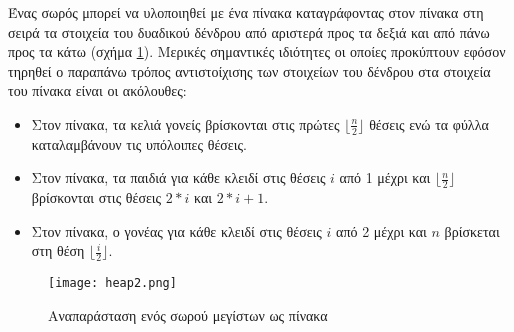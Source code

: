 Ένας σωρός μπορεί να υλοποιηθεί με ένα πίνακα καταγράφοντας στον πίνακα στη σειρά τα στοιχεία του δυαδικού δένδρου από αριστερά προς τα δεξιά και από πάνω προς τα κάτω (σχήμα \ref{fig:heap2}). Μερικές σημαντικές ιδιότητες οι οποίες προκύπτουν εφόσον τηρηθεί ο παραπάνω τρόπος αντιστοίχισης των στοιχείων του δένδρου στα στοιχεία του  πίνακα είναι οι ακόλουθες:
\begin{itemize}[noitemsep]
\item	Στον πίνακα, τα κελιά γονείς βρίσκονται στις πρώτες $\lfloor{\frac{n}{2}}\rfloor$ θέσεις ενώ τα φύλλα καταλαμβάνουν τις υπόλοιπες θέσεις. 
\item	Στον πίνακα, τα παιδιά για κάθε κλειδί στις θέσεις $i$ από 1 μέχρι και $\lfloor{\frac{n}{2}}\rfloor$ βρίσκονται στις θέσεις $2*i$ και $2*i + 1$.
\item	Στον πίνακα, ο γονέας για κάθε κλειδί στις θέσεις $i$ από 2 μέχρι και $n$ βρίσκεται στη θέση $\lfloor{\frac{i}{2}}\rfloor$.
\end{itemize}


\begin{figure}[ht]
\centering
\texttt{[image: heap2.png]}
\caption{Αναπαράσταση ενός σωρού μεγίστων ως πίνακα}
\label{fig:heap2}
\end{figure}

